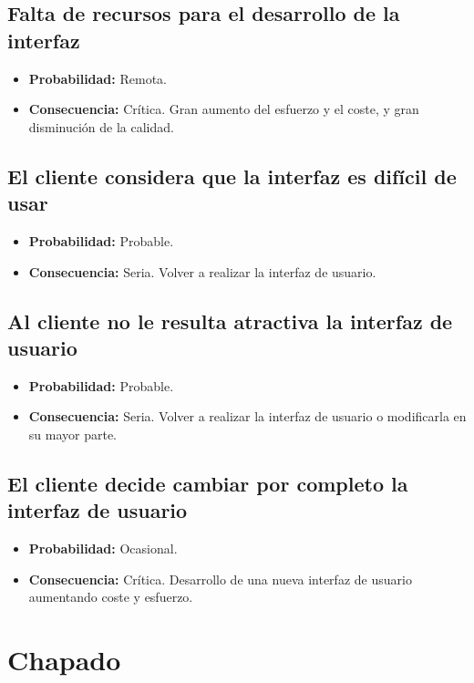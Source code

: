 \documentclass[spanish,a4paper,11pt, twoside]{report}	%
\begin{document}
	\subsection*{Falta de recursos para el desarrollo de la interfaz}
		\begin{itemize}
			\item \textbf {Probabilidad: }Remota.
			\item \textbf {Consecuencia: }Crítica. Gran aumento del esfuerzo y el coste, y gran disminución de la calidad.
		\end{itemize}
	
	\subsection*{El cliente considera que la interfaz es difícil de usar}
		\begin{itemize}
			\item \textbf {Probabilidad: }Probable.
			\item \textbf {Consecuencia: }Seria. Volver a realizar la interfaz de usuario.
		\end{itemize}
	
	\subsection*{Al cliente no le resulta atractiva la interfaz de usuario}
		\begin{itemize}
			\item \textbf {Probabilidad: }Probable.
			\item \textbf {Consecuencia: }Seria. Volver a realizar la interfaz de usuario o modificarla en su mayor parte.
		\end{itemize}
	
	\subsection*{El cliente decide cambiar por completo la interfaz de usuario}
		\begin{itemize}
			\item \textbf {Probabilidad: }Ocasional.
			\item \textbf {Consecuencia: }Crítica. Desarrollo de una nueva interfaz de usuario aumentando coste y esfuerzo.
		\end{itemize}

%
\section{Chapado}
\end{document}
